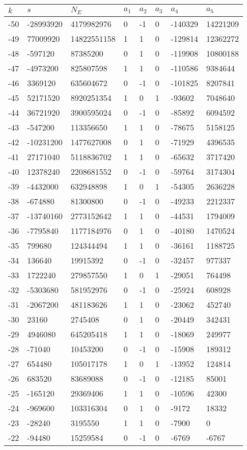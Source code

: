 \documentclass{amsart}
\begin{document}
\begin{longtable}{|l|l|l|lllll|}
\hline
$k$ & $s$ & $N_E$ & $a_1$ & $a_2$ & $a_3$ & $a_4$ & $a_5$\\
\hline
-50&-28993920&4179982976&0&-1&0&-140329&14221209\\
-49&77009920&14822551158&1&1&0&-129814&12362272\\
-48&-597120&87385200&0&1&0&-119908&10800188\\
-47&-4973200&825807598&1&1&0&-110586&9384644\\
-46&3369120&635604672&0&-1&0&-101825&8207841\\
-45&52171520&8920251354&1&0&1&-93602&7048640\\
-44&36721920&3900595024&0&-1&0&-85892&6094592\\
-43&-547200&113356650&1&1&0&-78675&5158125\\
-42&-10231200&1477627008&0&1&0&-71929&4396535\\
-41&27171040&5118836702&1&1&0&-65632&3717420\\
-40&12378240&2208681552&0&-1&0&-59764&3174304\\
-39&-4432000&632948898&1&0&1&-54305&2636228\\
-38&-674880&81300800&0&-1&0&-49233&2212337\\
-37&-13740160&2773152642&1&1&0&-44531&1794009\\
-36&-7795840&1177184976&0&1&0&-40180&1470524\\
-35&799680&124344494&1&1&0&-36161&1188725\\
-34&136640&19915392&0&-1&0&-32457&977337\\
-33&1722240&279857550&1&0&1&-29051&764498\\
-32&-5303680&581952976&0&-1&0&-25924&608928\\
-31&-2067200&481183626&1&1&0&-23062&452740\\
-30&23160&2745408&0&1&0&-20449&342431\\
-29&4946080&645205418&1&1&0&-18069&249977\\
-28&-71040&10453200&0&-1&0&-15908&189312\\
-27&654480&105017178&1&0&1&-13952&124814\\
-26&683520&83689088&0&-1&0&-12185&85001\\
-25&-165120&29369406&1&1&0&-10596&42300\\
-24&-969600&103316304&0&1&0&-9172&18332\\
-23&-28240&3195550&1&1&0&-7900&0\\
-22&-94480&15259584&0&-1&0&-6769&-6767\\

\end{longtable}
\end{document}
